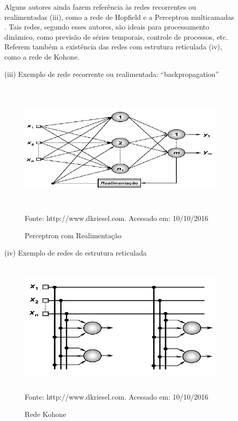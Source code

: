 \begin{itemize}
\begin{enumerate}
	      Alguns autores ainda fazem referência às redes recorrentes ou realimentadas (iii), 
	      como a rede de Hopfield e a Perceptron multicamadas \cite{Kriesel2007NeuralNetworks}. 
	      Tais redes, segundo esses autores, são ideais para processamento dinâmico, como previsão de 
	      séries temporais, controle de processos, etc.
	      Referem também a existência das redes com estrutura reticulada (iv), como a rede de Kohone.
	      \item [(iii)] Exemplo de rede recorrente ou realimentada: ``backpropagation''
	      \begin{figure}[!ht]
			\centering
			\caption{Perceptron com Realimentação}
			\vspace{1mm}
			  \includegraphics[width=100mm, height=65mm]{Figuras/Neural/Recorrentes.png}\\
			\tiny Fonte: http://www.dkriesel.com. Acessado em: 10/10/2016
	      \end{figure}  
	 
	      \item [(iv)] Exemplo de redes de estrutura reticulada
	      \begin{figure}[!ht]
			\centering
			\caption{Rede Kohone}
			\vspace{1mm}
			  \includegraphics[width=100mm, height=65mm]{Figuras/Neural/Kohone.png}\\
			\tiny Fonte: http://www.dkriesel.com. Acessado em: 10/10/2016
	      \end{figure}
	

\end{enumerate}
\end{itemize}
